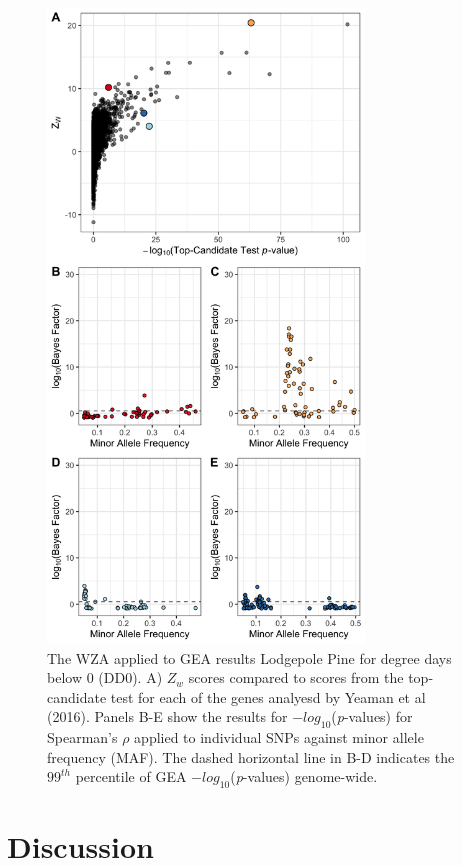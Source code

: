 \documentclass[11pt,twoside,lineno]{GSA_format}
\begin{document}
\begin{figure}[H]
  \includegraphics[width=0.75\textwidth,height=0.75\textheight,keepaspectratio]{../dataAnalsis/Z_v_MAF_DD0.png}
  \caption{The WZA applied to GEA results Lodgepole Pine for degree days below 0 (DD0). A) $Z_w$ scores compared to scores from the top-candidate test for each of the genes analyesd by Yeaman et al (2016). Panels B-E show the results for $-log_{10}$(\textit{p}-values) for Spearman's $\rho$ applied to individual SNPs against minor allele frequency (MAF). The dashed horizontal line in B-D indicates the $99^{th}$ percentile of GEA $-log_{10}$(\textit{p}-values) genome-wide.}

  \label{fig:lodgepole}
\end{figure}


\section{Discussion}
\end{document}
